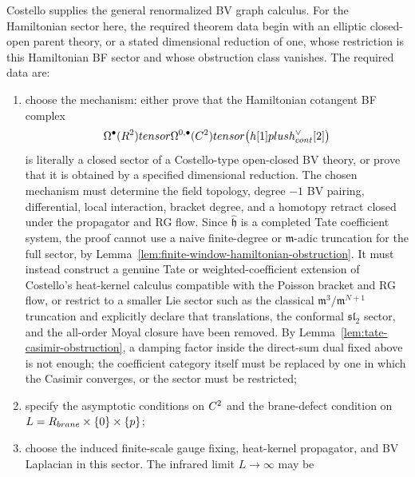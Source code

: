 \documentclass[11pt]{memoir}
\begin{document}
\begin{prob}\label{prob:analytic-graph-realization}
  Costello supplies the general renormalized BV graph calculus. For the
  Hamiltonian sector here, the required theorem data begin with
  an elliptic closed-open parent theory, or a stated dimensional
  reduction of one, whose restriction is this Hamiltonian BF sector and whose
  obstruction class vanishes. The required data are:
  \begin{enumerate}
    \item choose the mechanism: either prove that the Hamiltonian cotangent BF
      complex
      $$\Omega^\bullet(R^2)tensor
        \Omega^{0,\bullet}(C^2)tensor
        \bigl(h[1]plus
        h^{\vee}_{cont}[2]\bigr)$$
      is literally a closed sector of a Costello-type open-closed BV theory, or
      prove that it is obtained by a specified dimensional reduction. The chosen
      mechanism must determine the field topology, degree $-1$ BV pairing,
      differential, local interaction, bracket degree, and a homotopy retract
      closed under the propagator and RG flow. Since
      $\widehat{\mathfrak h}$ is a completed Tate coefficient system, the proof
      cannot use a naive finite-degree or $\mathfrak m$-adic truncation for the
      full sector, by
      Lemma~\ref{lem:finite-window-hamiltonian-obstruction}. It must instead
      construct a genuine Tate or weighted-coefficient extension of Costello's
      heat-kernel calculus \cite{costello-renormalization} compatible with the Poisson bracket
      and RG flow, or restrict to a smaller Lie sector such as the
      classical $\mathfrak m^3/\mathfrak m^{N+1}$ truncation and
      explicitly declare that translations, the conformal
      $\mathfrak{sl}_2$ sector, and the all-order Moyal closure have
      been removed. By
      Lemma~\ref{lem:tate-casimir-obstruction}, a damping factor inside the
      direct-sum dual fixed above is not enough; the coefficient category
      itself must be replaced by one in which the Casimir converges, or the
      sector must be restricted;
    \item specify the asymptotic conditions on $C^2$ and the brane-defect
      condition on \(L=R_{brane}\times\{0\}\times\{p\}\);
    \item choose the induced finite-scale gauge fixing, heat-kernel propagator,
      and BV Laplacian in this sector. The infrared limit $L\to\infty$ may be

\end{enumerate}
\end{prob}
\end{document}
